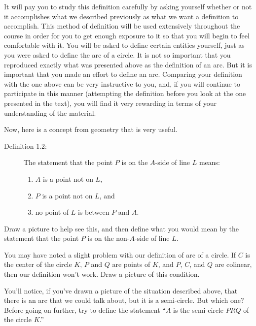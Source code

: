 \documentclass[english]{book}
\begin{document}
It will pay you to study this definition carefully by asking yourself whether or not it accomplishes what we described previously as what we want a definition to accomplish. This method of definition will be used extensively throughout the course in order for you to get enough exposure to it so that you will begin to feel comfortable with it. You will be asked to define certain entities yourself, just as you were asked to define the arc of a circle. It is not so important that you reproduced exactly what was presented above as the definition of an arc. But it is important that you made an effort to define an arc. Comparing your definition with the one above can be very instructive to you, and, if you will continue to participate in this manner (attempting the definition before you look at the one presented in the text), you will find it very rewarding in terms of your understanding of the material.

Now, here is a concept from geometry that is very useful.

\begin{description}
\item[Definition 1.2:] The statement that the point $P$ is on the $A$-side of line $L$ means:
  \begin{enumerate}[\hspace{1cm}1)]
    \item $A$ is a point not on $L$,
    \item $P$ is a point not on $L$, and
    \item no point of $L$ is between $P$ and $A$.
  \end{enumerate}
\end{description}

Draw a picture to help see this, and then define what you would mean by the statement that the point $P$ is on the non-$A$-side of line $L$.

You may have noted a slight problem with our definition of arc of a circle. If $C$ is the center of the circle $K$, $P$ and $Q$ are points of $K$, and $P$, $C$, and $Q$ are colinear, then our definition won't work. Draw a picture of this condition.

You'll notice, if you've drawn a picture of the situation described above, that there is an arc that we could talk about, but it is a semi-circle. But which one? Before going on further, try to define the statement ``$A$ is the semi-circle $PRQ$ of the circle $K$.''
\end{document}
